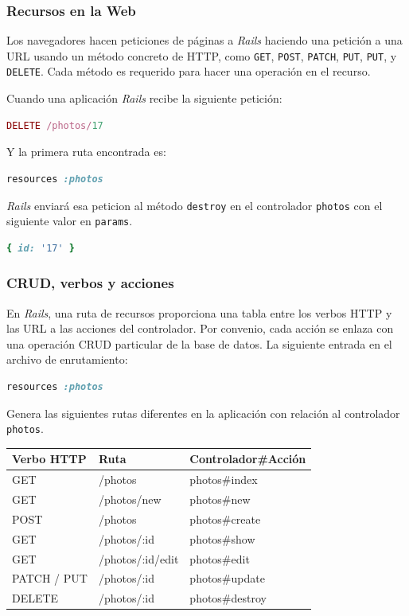 \subsubsection{Recursos en la Web}
Los navegadores hacen peticiones de páginas a \textit{Rails} haciendo una petición a una URL usando un método concreto de HTTP, como \texttt{GET}, \texttt{POST}, \texttt{PATCH}, \texttt{PUT}, \texttt{PUT}, y \texttt{DELETE}. Cada método es requerido para hacer una operación en el recurso. 

Cuando una aplicación \textit{Rails} recibe la siguiente petición:

\begin{lstlisting}[language=Ruby]
DELETE /photos/17
\end{lstlisting}

Y la primera ruta encontrada es:

\begin{lstlisting}[language=Ruby]
resources :photos
\end{lstlisting}

\textit{Rails} enviará esa peticion al método \texttt{destroy} en el controlador \texttt{photos} con el siguiente valor en \texttt{params}.

\begin{lstlisting}[language=Ruby]
{ id: '17' }
\end{lstlisting}

\subsubsection{CRUD, verbos y acciones}
En \textit{Rails}, una ruta de recursos proporciona una tabla entre los verbos HTTP y las URL a las acciones del controlador. Por convenio, cada acción se enlaza con una operación CRUD particular de la base de datos.
La siguiente entrada en el archivo de enrutamiento:

\begin{lstlisting}[language=Ruby]
resources :photos
\end{lstlisting}

Genera las siguientes rutas diferentes en la aplicación con relación al controlador \texttt{photos}.

\begin{center}
	\begin{tabular}{| p{4cm} | p{4cm} | p{4cm} | }
	\hline
	Verbo HTTP & Ruta & Controlador\#Acción \\ \hline
	GET & /photos & photos\#index \\	
	GET & /photos/new & photos\#new \\
	POST & /photos & photos\#create \\
	GET & /photos/:id & photos\#show \\
	GET & /photos/:id/edit & photos\#edit \\
	PATCH / PUT & /photos/:id & photos\#update \\
	DELETE & /photos/:id & photos\#destroy \\  
	\hline
	\end{tabular}
\end{center}


